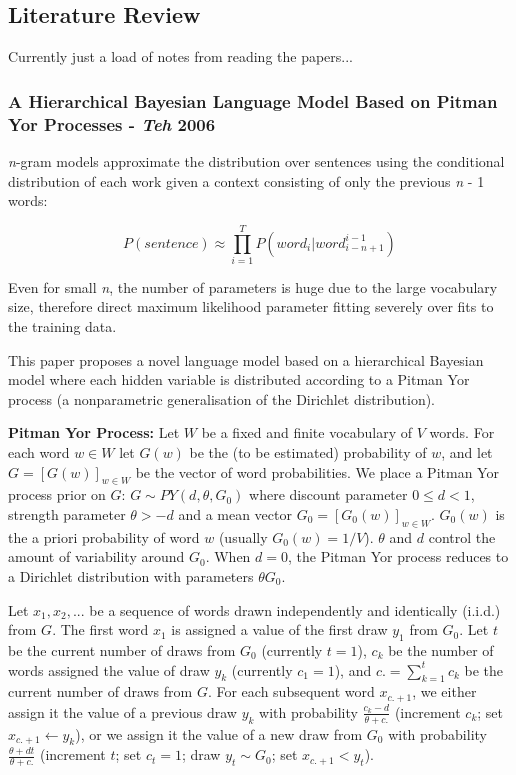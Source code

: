 
\subsection{Literature Review}

Currently just a load of notes from reading the papers...

\subsubsection{A Hierarchical Bayesian Language Model Based on Pitman Yor Processes - \textit{Teh} 2006}

\textit{n}-gram models approximate the distribution over sentences using the conditional distribution of each work given a context consisting of only the previous \textit{n} - 1 words:

\begin{equation}
P(sentence)\approx\prod_{i=1}^{T}P(word_{i}|word_{i-n+1}^{i-1})
\label{eq:nGramModel}
\end{equation}

Even for small \textit{n}, the number of parameters is huge due to the large vocabulary size, therefore direct maximum likelihood parameter fitting severely over fits to the training data.

This paper proposes a novel language model based on a hierarchical Bayesian model where each hidden variable is distributed according to a Pitman Yor process (a nonparametric generalisation of the Dirichlet distribution).

\textbf{Pitman Yor Process:} Let $W$ be a fixed and finite vocabulary of $V$ words. For each word $w \in W$ let $G(w)$ be the (to be estimated) probability of $w$, and let $G = [G(w)]_{w\in W}$ be the vector of word probabilities. We place a Pitman Yor process prior on $G$: $G \sim PY(d, \theta, G_{0})$ where discount parameter $0\leq d <1$, strength parameter $\theta >-d$ and a mean vector $G_{0} = [G_{0}(w)]_{w\in W}$. $G_{0}(w)$ is the a priori probability of word $w$ (usually $G_{0}(w) = 1/V$). $\theta$ and $d$ control the amount of variability around $G_{0}$. When $d=0$, the Pitman Yor process reduces to a Dirichlet distribution with parameters $\theta G_{0}$.

Let $x_{1}, x_{2}, ...$ be a sequence of words drawn independently and identically (i.i.d.) from $G$. The first word $x_{1}$ is assigned a value of the first draw $y_{1}$ from $G_{0}$. Let $t$ be the current number of draws from $G_{0}$ (currently $t=1$), $c_{k}$ be the number of words assigned the value of draw $y_{k}$ (currently $c_{1}=1$), and $c.=\sum_{k=1}^{t}c_{k}$ be the current number of draws from $G$. For each subsequent word $x_{c.+1}$, we either assign it the value of a previous draw $y_{k}$ with probability $\frac{c_{k}-d}{\theta +c.}$ (increment $c_{k}$; set $x_{c.+1}\leftarrow y_{k}$), or we assign it the value of a new draw from $G_{0}$ with probability $\frac{\theta +dt}{\theta +c.}$ (increment $t$; set $c_{t}=1$; draw $y_{t}\sim G_{0}$; set $x_{c.+1}<y_{t}$).

